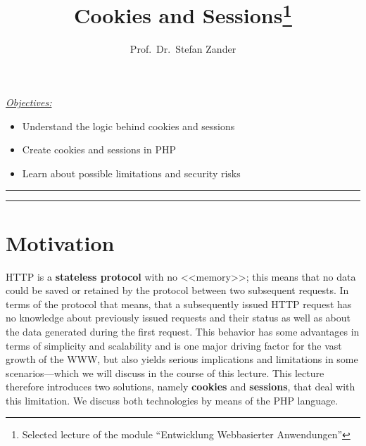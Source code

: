 \documentclass[a4paper, justified, notoc]{tufte-handout} %
\title{Cookies and Sessions\thanks{Selected lecture of the module ``Entwicklung Webbasierter Anwendungen''}}
\author[opt Author]{Prof.\ Dr.\ Stefan Zander}
\newenvironment{lernziele}{
	\begin{mdframed}[hidealllines=true,backgroundcolor=gray!20] 
	\small \itshape
	\noindent \underline{Objectives:} 
	} 
	{ 
	\end{mdframed}
}
\begin{document}
\maketitle%


\begin{lernziele}
\begin{itemize}
	\item Understand the logic behind cookies and sessions
	\item Create cookies and sessions in PHP
	\item Learn about possible limitations and security risks
\end{itemize}
\end{lernziele}


\setcounter{secnumdepth}{2} %

\noindent \rule{1.54\textwidth}{0.4pt}
\tableofcontents
\noindent \rule{1.54\textwidth}{0.4pt}

\section{Motivation}\label{sec:motivation}

HTTP is a \textbf{stateless protocol} with no <<memory>>; this means that no data could be saved or retained by the protocol between two subsequent requests. In terms of the protocol that means, that a subsequently issued HTTP request has no knowledge about previously issued requests and their status as well as about the data generated during the first request. This behavior has some advantages in terms of simplicity and scalability and is one major driving factor for the vast growth of the WWW, but also yields serious implications and limitations in some scenarios---which we will discuss in the course of this lecture. This lecture therefore introduces two solutions, namely \textbf{cookies} and \textbf{sessions}, that deal with this limitation. We discuss both technologies by means of the PHP language.
\end{document}

